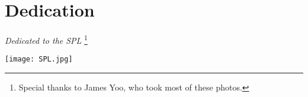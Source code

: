 \chapter{Dedication}

\begin{center}
\textit{Dedicated to the SPL}%
\footnote{Special thanks to James Yoo, who took most of these photos.}

\hfill

\texttt{[image: SPL.jpg]}
\end{center}